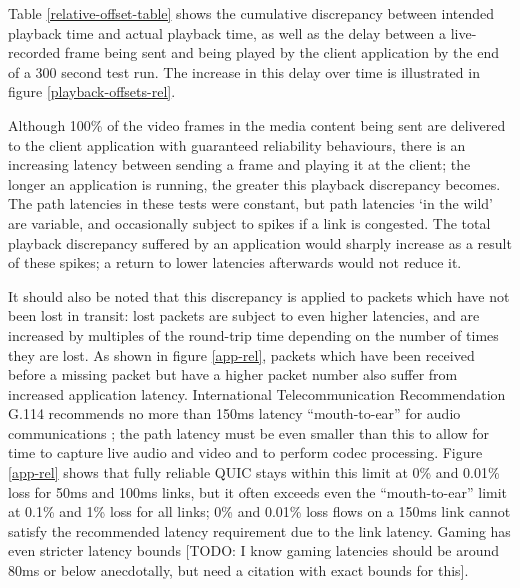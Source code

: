 \documentclass{mpaper}
\begin{document}
Table \ref{relative-offset-table} shows the cumulative discrepancy between intended playback time and actual playback time, as well as the delay between a live-recorded frame being sent and being played by the client application by the end of a 300 second test run. The increase in this delay over time is illustrated in figure \ref{playback-offsets-rel}.


Although 100\% of the video frames in the media content being sent are delivered to the client application with guaranteed reliability behaviours, there is an increasing latency between sending a frame and playing it at the client; the longer an application is running, the greater this playback discrepancy becomes. The path latencies in these tests were constant, but path latencies `in the wild' are variable, and occasionally subject to spikes if a link is congested. The total playback discrepancy suffered by an application would sharply increase as a result of these spikes; a return to lower latencies afterwards would not reduce it.


It should also be noted that this discrepancy is applied to packets which have not been lost in transit: lost packets are subject to even higher latencies, and are increased by multiples of the round-trip time depending on the number of times they are lost. As shown in figure \ref{app-rel}, packets which have been received before a missing packet but have a higher packet number also suffer from increased application latency. International Telecommunication Recommendation G.114 recommends no more than 150ms latency ``mouth-to-ear'' for audio communications \cite{ITU-REC}; the path latency must be even smaller than this to allow for time to capture live audio and video and to perform codec processing. Figure \ref{app-rel} shows that fully reliable QUIC stays within this limit at 0\% and 0.01\% loss for 50ms and 100ms links, but it often exceeds even the ``mouth-to-ear'' limit at 0.1\% and 1\% loss for all links; 0\% and 0.01\% loss flows on a 150ms link cannot satisfy the recommended latency requirement due to the link latency. Gaming has even stricter latency bounds [TODO: I know gaming latencies should be around 80ms or below anecdotally, but need a citation with exact bounds for this].
\end{document}
